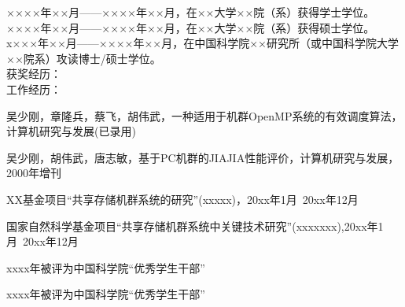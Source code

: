 \begin{resume}


\noindent
××××年××月——××××年××月，在××大学××院（系）获得学士学位。\\
\noindent
××××年××月——××××年××月，在××大学××院（系）获得硕士学位。\\
\noindent
x×××年××月——××××年××月，在中国科学院××研究所（或中国科学院大学××院系）攻读博士/硕士学位。\\
\noindent
获奖经历：\\
\noindent
工作经历：\\


  \begin{enumerate}[{[}1{]}]
  \item 吴少刚，章隆兵，蔡飞，胡伟武，一种适用于机群OpenMP系统的有效调度算法，计算机研究与发展(已录用)
  \item 吴少刚，胡伟武，唐志敏，基于PC机群的JIAJIA性能评价，计算机研究与发展，2000年增刊

  \end{enumerate}

  \begin{enumerate}[{[}1{]}]
  \item XX基金项目“共享存储机群系统的研究”(xxxxx)，20xx年1月~20xx年12月
  \item 国家自然科学基金项目“共享存储机群系统中关键技术研究”(xxxxxxx),20xx年1月~20xx年12月
  \end{enumerate}

  \begin{enumerate}[{[}1{]}]
  \item  xxxx年被评为中国科学院“优秀学生干部”
  \item xxxx年被评为中国科学院“优秀学生干部”
  \end{enumerate}
\end{resume}
